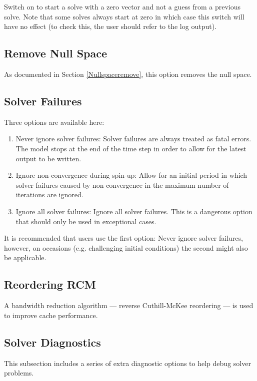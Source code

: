 Switch on to start a solve with a zero vector and not a guess from a previous solve. Note that some solves always start at zero in which case this switch will have no effect (to check this, the user should refer to the log output). 

\subsection{Remove Null Space}

As documented in Section \ref{Nullspaceremove}, this option removes the null space.

\subsection{Solver Failures}

Three options are available here:

\begin{enumerate}
\item Never ignore solver failures: Solver failures are always treated as fatal errors. The model stops at the end of the time step in order to allow for the latest output to be written. 
\item Ignore non-convergence during spin-up: Allow for an initial period in which solver failures caused by non-convergence in the maximum number of iterations are ignored. 
\item Ignore all solver failures: Ignore all solver failures. This is a dangerous option that should only be used in exceptional cases. 
\end{enumerate}

It is recommended that users use the first option: Never ignore solver failures, however, on occasions (e.g. challenging initial conditions) the second might also be applicable. 

\subsection{Reordering RCM}

A bandwidth reduction algorithm --- reverse Cuthill-McKee reordering --- is used to improve cache performance.

\subsection{Solver Diagnostics}

This subsection includes a series of extra diagnostic options to help debug solver problems. 

